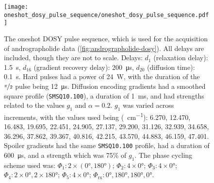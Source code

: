 \begin{figure}[H]
    \centering
    \texttt{[image: oneshot\_dosy\_pulse\_sequence/oneshot\_dosy\_pulse\_sequence.pdf]}
    \caption[
        The oneshot \acs{DOSY} pulse sequence, which is used for the
        acquisition of andrographolide data.
    ]{
        The oneshot \ac{DOSY} pulse sequence, which is used for the acquisition
        of andrographolide data (\cref{fig:andrographolide-dosy}). All
        delays are included, though they are not to scale.
        Delays:
        $d_1$ (relaxation delay): \qty{1.5}{\second},
        $d_{16}$ (gradient recovery delay): \qty{200}{\micro\second},
        $d_{20}$ (diffusion time): \qty{0.1}{\second}.
        Hard pulses had a power of \qty{24}{\watt},
        with the duration of the $\nicefrac{\pi}{2}$ pulse being
        \qty{12}{\micro\second}.
        Diffusion encoding gradients had a smoothed square profile
        (\texttt{SMSQ10.100}), a duration of \qty{1}{\milli\second}, and had
        strengths related to the values $g_1$ and $\alpha = 0.2$.
        $g_1$ was varied across increments, with the values used
        being (\unit{\gauss \per \centi \meter}):
        6.270,
        12.470,
        16.483,
        19.695,
        22.451,
        24.905,
        27.137,
        29.200,
        31.126,
        32.939,
        34.658,
        36.296,
        37.862,
        39.367,
        40.816,
        42.215,
        43.570,
        44.883,
        46.159,
        47.401.
        Spoiler gradients had the same \texttt{SMSQ10.100} profile, had a
        duration of \qty{600}{\micro\second}, and a strength which was 75\% of
        $g_1$.
        The phase cycling scheme used was:
        $\Phi_1: 2 \times (\ang{0}, \ang{180})$;
        $\Phi_2: 4 \times \ang{0}$;
        $\Phi_3: 4 \times \ang{0}$;
        $\Phi_4: 2 \times \ang{0}, 2 \times \ang{180}$;
        $\Phi_5: 4 \times \ang{0}$;
        $\Phi_{\text{rx}}: \ang{0}, \ang{180}, \ang{180}, \ang{0}$.
    }
    \label{fig:oneshot-dosy}


\end{figure}
